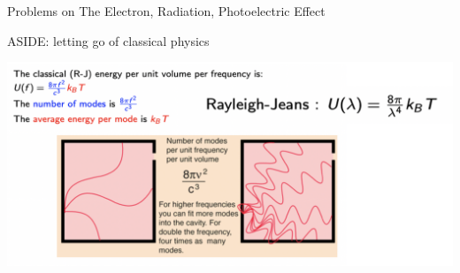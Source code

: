 \begin{frame}{Problems on The Electron, Radiation, Photoelectric Effect}
\small

\end{frame}

\begin{frame}{ASIDE: letting go of classical physics }
\small

\includegraphics[scale=0.45]{rj1}
\end{frame}


